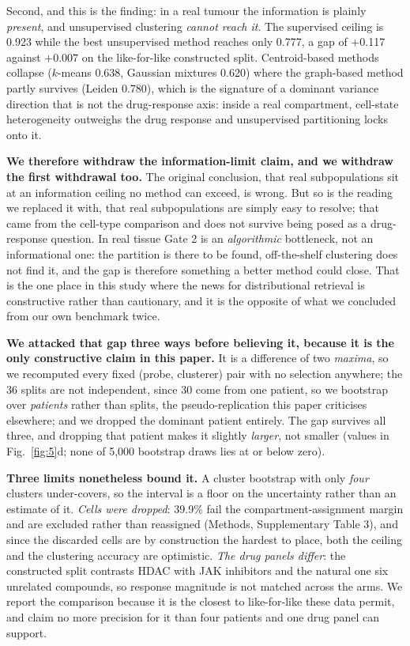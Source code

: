 \documentclass[11pt,letterpaper]{article}
\begin{document}
Second, and this is the finding: in a real tumour the information is plainly \emph{present}, and
unsupervised clustering \emph{cannot reach it}. The supervised ceiling is 0.923 while the
best unsupervised method reaches only 0.777, a gap of $+$0.117 against $+0.007$
on the like-for-like constructed split. Centroid-based methods collapse ($k$-means 0.638, Gaussian
mixtures 0.620) where the graph-based method partly survives (Leiden 0.780), which is the signature
of a dominant variance direction that is not the drug-response axis: inside a real compartment,
cell-state heterogeneity outweighs the drug response and unsupervised partitioning locks onto it.

\textbf{We therefore withdraw the information-limit claim, and we withdraw the first withdrawal
too.} The original conclusion, that real subpopulations sit at an information ceiling no method can
exceed, is wrong. But so is the reading we replaced it with, that real subpopulations are simply
easy to resolve; that came from the cell-type comparison and does not survive being posed as a
drug-response question. In real tissue Gate 2 is an \emph{algorithmic} bottleneck, not an
informational one: the partition is there to be found, off-the-shelf clustering does not find it,
and the gap is therefore something a better method could close. That is the one place in this study
where the news for distributional retrieval is constructive rather than cautionary, and it is the
opposite of what we concluded from our own benchmark twice.

\textbf{We attacked that gap three ways before believing it, because it is the only constructive
claim in this paper.} It is a difference of two \emph{maxima}, so we recomputed every fixed
(probe, clusterer) pair with no selection anywhere; the 36 splits are not independent, since 30
come from one patient, so we bootstrap over \emph{patients} rather than splits, the
pseudo-replication this paper criticises elsewhere; and we dropped the dominant patient entirely.
The gap survives all three, and dropping that patient makes it slightly \emph{larger}, not smaller
(values in Fig.~\ref{fig:5}d; none of 5,000 bootstrap draws lies at or below zero).

\textbf{Three limits nonetheless bound it.} A cluster bootstrap with only \emph{four} clusters
under-covers, so the interval is a floor on the uncertainty rather than an estimate of it.
\emph{Cells were dropped}: 39.9\% fail the compartment-assignment margin and are excluded rather
than reassigned (Methods, Supplementary Table 3), and since the discarded cells are by construction
the hardest to place, both the ceiling and the clustering accuracy are optimistic. \emph{The drug
panels differ}: the constructed split contrasts HDAC with JAK inhibitors and the natural one six
unrelated compounds, so response magnitude is not matched across the arms. We report the comparison
because it is the closest to like-for-like these data permit, and claim no more precision for it
than four patients and one drug panel can support.
\end{document}
